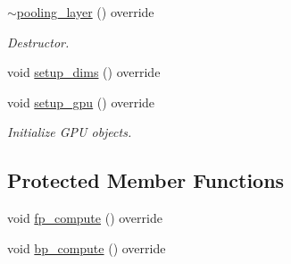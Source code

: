 \begin{DoxyCompactItemize}
\item 
\hyperlink{classlbann_1_1pooling__layer_acdd563bbeab301496456dfb058fcb640}{$\sim$pooling\+\_\+layer} () override
\begin{DoxyCompactList}\small\item\em Destructor. \end{DoxyCompactList}\item 
void \hyperlink{classlbann_1_1pooling__layer_a5de83fe60224067c132b0f1d53024b57}{setup\+\_\+dims} () override
\item 
void \hyperlink{classlbann_1_1pooling__layer_a603adc8abc7527f2fd12eb4264b0f3cc}{setup\+\_\+gpu} () override
\begin{DoxyCompactList}\small\item\em Initialize G\+PU objects. \end{DoxyCompactList}\end{DoxyCompactItemize}
\subsection*{Protected Member Functions}
\begin{DoxyCompactItemize}
\item 
void \hyperlink{classlbann_1_1pooling__layer_a0af01b6939abe9798fa3a0b1f5292721}{fp\+\_\+compute} () override
\item 
void \hyperlink{classlbann_1_1pooling__layer_ab58fe97e976f60df37f958e79fd56ff9}{bp\+\_\+compute} () override
\end{DoxyCompactItemize}
